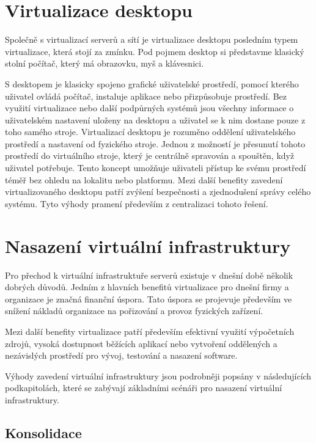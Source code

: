 \section{Virtualizace desktopu}

Společně s virtualizací serverů a sítí je virtualizace desktopu posledním typem virtualizace, která stojí za zmínku. Pod pojmem desktop si představme klasický stolní počítač, který má obrazovku, myš a klávesnici.

S desktopem je klasicky spojeno grafické uživatelské prostředí, pomocí kterého uživatel ovládá počítač, instaluje aplikace nebo přizpůsobuje prostředí. Bez využití virtualizace nebo další podpůrných systémů jsou všechny informace o uživatelském nastavení uloženy
na desktopu a uživatel se k nim dostane pouze z toho samého stroje. Virtualizací desktopu je rozuměno oddělení uživatelského prostředí a nastavení od fyzického stroje. Jednou z možností je přesunutí tohoto prostředí do virtuálního stroje, který je centrálně spravován a
spouštěn, když uživatel potřebuje. Tento koncept umožňuje uživateli přístup ke svému prostředí téměř bez ohledu na lokalitu nebo platformu. Mezi další benefity zavedení virtualizovaného desktopu patří zvýšení bezpečnosti a zjednodušení správy
celého systému. Tyto výhody pramení především z centralizaci tohoto řešení.

\section{Nasazení virtuální infrastruktury}
\label{vm_deployment}

Pro přechod k virtuální infrastruktuře serverů existuje v dnešní době několik dobrých důvodů. Jedním z hlavních benefitů virtualizace pro dnešní firmy a organizace je značná finanční úspora. Tato úspora se
projevuje především ve snížení nákladů organizace na pořizování a provoz fyzických zařízení. 

Mezi další benefity virtualizace patří především efektivní využití výpočetních zdrojů, vysoká dostupnost běžících aplikací nebo vytvoření oddělených a nezávislých prostředí pro vývoj, testování a nasazení software.

Výhody zavedení virtuální infrastruktury jsou podrobněji popsány v následujících podkapitolách, které se zabývají základními scénáři pro nasazení virtuální infrastruktury.

\subsection{Konsolidace}
\label{consolidation}

